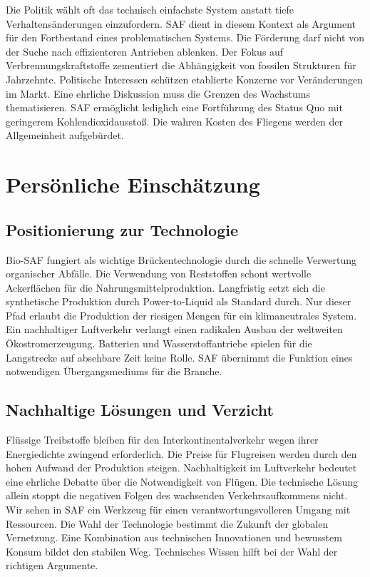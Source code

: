 \documentclass[12pt,a4paper]{article}
\begin{document}
Die Politik wählt oft das technisch einfachste System anstatt tiefe Verhaltensänderungen einzufordern. SAF dient in diesem Kontext als Argument für den Fortbestand eines problematischen Systems. Die Förderung darf nicht von der Suche nach effizienteren Antrieben ablenken. Der Fokus auf Verbrennungskraftstoffe zementiert die Abhängigkeit von fossilen Strukturen für Jahrzehnte. Politische Interessen schützen etablierte Konzerne vor Veränderungen im Markt. Eine ehrliche Diskussion muss die Grenzen des Wachstums thematisieren. SAF ermöglicht lediglich eine Fortführung des Status Quo mit geringerem Kohlendioxidausstoß. Die wahren Kosten des Fliegens werden der Allgemeinheit aufgebürdet.

\newpage
\section{Persönliche Einschätzung}

\subsection{Positionierung zur Technologie}
Bio-SAF fungiert als wichtige Brückentechnologie durch die schnelle Verwertung organischer Abfälle. Die Verwendung von Reststoffen schont wertvolle Ackerflächen für die Nahrungsmittelproduktion. Langfristig setzt sich die synthetische Produktion durch Power-to-Liquid als Standard durch. Nur dieser Pfad erlaubt die Produktion der riesigen Mengen für ein klimaneutrales System. Ein nachhaltiger Luftverkehr verlangt einen radikalen Ausbau der weltweiten Ökostromerzeugung. Batterien und Wasserstoffantriebe spielen für die Langstrecke auf absehbare Zeit keine Rolle. SAF übernimmt die Funktion eines notwendigen Übergangsmediums für die Branche.

\subsection{Nachhaltige Lösungen und Verzicht}
Flüssige Treibstoffe bleiben für den Interkontinentalverkehr wegen ihrer Energiedichte zwingend erforderlich. Die Preise für Flugreisen werden durch den hohen Aufwand der Produktion steigen. Nachhaltigkeit im Luftverkehr bedeutet eine ehrliche Debatte über die Notwendigkeit von Flügen. Die technische Lösung allein stoppt die negativen Folgen des wachsenden Verkehrsaufkommens nicht. Wir sehen in SAF ein Werkzeug für einen verantwortungsvolleren Umgang mit Ressourcen. Die Wahl der Technologie bestimmt die Zukunft der globalen Vernetzung. Eine Kombination aus technischen Innovationen und bewusstem Konsum bildet den stabilen Weg. Technisches Wissen hilft bei der Wahl der richtigen Argumente.
\end{document}
